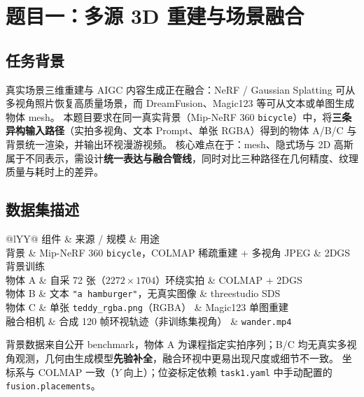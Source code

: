 \documentclass[10pt,twocolumn,letterpaper]{article}
\newcommand{\cvprtable}[1]{%
  \scriptsize
  \setlength{\tabcolsep}{2.5pt}%
  \renewcommand{\arraystretch}{1.08}%
  #1%
}
\begin{document}
\section{题目一：多源 3D 重建与场景融合}
\label{sec:task1}

\subsection{任务背景}
\label{sec:task1_bg}

真实场景三维重建与 AIGC 内容生成正在融合：NeRF / Gaussian Splatting 可从多视角照片恢复高质量场景，而 DreamFusion、Magic123 等可从文本或单图生成物体 mesh。
本题目要求在同一真实背景（Mip-NeRF 360 \texttt{bicycle}）中，将\textbf{三条异构输入路径}（实拍多视角、文本 Prompt、单张 RGBA）得到的物体 A/B/C 与背景统一渲染，并输出环视漫游视频。
核心难点在于：mesh、隐式场与 2D 高斯属于不同表示，需设计\textbf{统一表达与融合管线}，同时对比三种路径在几何精度、纹理质量与耗时上的差异。

\subsection{数据集描述}
\label{sec:task1_data}

\begin{table}[t]
  \centering
  \caption{题目一数据集与资产来源。}
  \label{tab:task1_dataset}
  \cvprtable{%
  \begin{tabularx}{\linewidth}{@{}lYY@{}}
    \toprule
    组件 & 来源 / 规模 & 用途 \\
    \midrule
    背景 & Mip-NeRF 360 \texttt{bicycle}，COLMAP 稀疏重建 + 多视角 JPEG & 2DGS 背景训练 \\
    物体 A & 自采 72 张（$2272{\times}1704$）环绕实拍 & COLMAP + 2DGS \\
    物体 B & 文本 \texttt{"a hamburger"}，无真实图像 & threestudio SDS \\
    物体 C & 单张 \texttt{teddy\_rgba.png}（RGBA） & Magic123 单图重建 \\
    融合相机 & 合成 120 帧环视轨迹（非训练集视角） & \texttt{wander.mp4} \\
    \bottomrule
  \end{tabularx}%
  }
\end{table}

背景数据来自公开 benchmark，物体 A 为课程指定实拍序列；B/C 均无真实多视角观测，几何由生成模型\textbf{先验补全}，融合环视中更易出现尺度或细节不一致。
坐标系与 COLMAP 一致（$Y$ 向上）；位姿标定依赖 \texttt{task1.yaml} 中手动配置的 \texttt{fusion.placements}。
\end{document}
